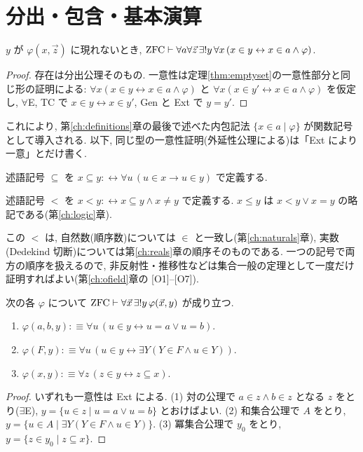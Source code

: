 \section{分出・包含・基本演算}

\begin{thm}\label{thm:separation-term}
  $y$ が $\varphi(x, \vec z)$ に現れないとき, $\mathrm{ZFC} \vdash \forall a\forall \vec z\,\exists ! y\,\forall x\,(x \in y \leftrightarrow x \in a \land \varphi)$.
\end{thm}
\begin{proof}
  存在は分出公理そのもの. 一意性は定理\ref{thm:emptyset}の一意性部分と同じ形の証明による: $\forall x(x \in y \leftrightarrow x \in a \land \varphi)$ と $\forall x(x \in y' \leftrightarrow x \in a \land \varphi)$ を仮定し, $\forall$E, TC で $x \in y \leftrightarrow x \in y'$, Gen と Ext で $y = y'$.
\end{proof}

これにより, 第\ref{ch:definitions}章の最後で述べた内包記法 $\{x \in a \mid \varphi\}$ が関数記号として導入される. 以下, 同じ型の一意性証明(外延性公理による)は「Ext により一意」とだけ書く.

\begin{dfn}[包含]
  述語記号 $\subseteq$ を $x \subseteq y :\leftrightarrow \forall u\,(u \in x \to u \in y)$ で定義する.
\end{dfn}

\begin{dfn}[順序]\label{dfn:lt}
  述語記号 $<$ を $x < y :\leftrightarrow x \subseteq y \land x \neq y$ で定義する. $x \leq y$ は $x < y \lor x = y$ の略記である(第\ref{ch:logic}章).
\end{dfn}

この $<$ は, 自然数(順序数)については $\in$ と一致し(第\ref{ch:naturals}章), 実数(Dedekind 切断)については第\ref{ch:reals}章の順序そのものである. 一つの記号で両方の順序を扱えるので, 非反射性・推移性などは集合一般の定理として一度だけ証明すればよい(第\ref{ch:ofield}章の [O1]--[O7]).

\begin{thm}\label{thm:basic-sets}
  次の各 $\varphi$ について $\mathrm{ZFC} \vdash \forall \vec x\,\exists ! y\,\varphi(\vec x, y)$ が成り立つ.
  \begin{enumerate}[label=(\arabic*)]
    \item $\varphi(a, b, y) :\equiv \forall u\,(u \in y \leftrightarrow u = a \lor u = b)$.
    \item $\varphi(F, y) :\equiv \forall u\,(u \in y \leftrightarrow \exists Y(Y \in F \land u \in Y))$.
    \item $\varphi(x, y) :\equiv \forall z\,(z \in y \leftrightarrow z \subseteq x)$.
  \end{enumerate}
\end{thm}
\begin{proof}
  いずれも一意性は Ext による. (1) 対の公理で $a \in z \land b \in z$ となる $z$ をとり($\exists$E), $y = \{u \in z \mid u = a \lor u = b\}$ とおけばよい. (2) 和集合公理で $A$ をとり, $y = \{u \in A \mid \exists Y(Y \in F \land u \in Y)\}$. (3) 冪集合公理で $y_0$ をとり, $y = \{z \in y_0 \mid z \subseteq x\}$.
\end{proof}

